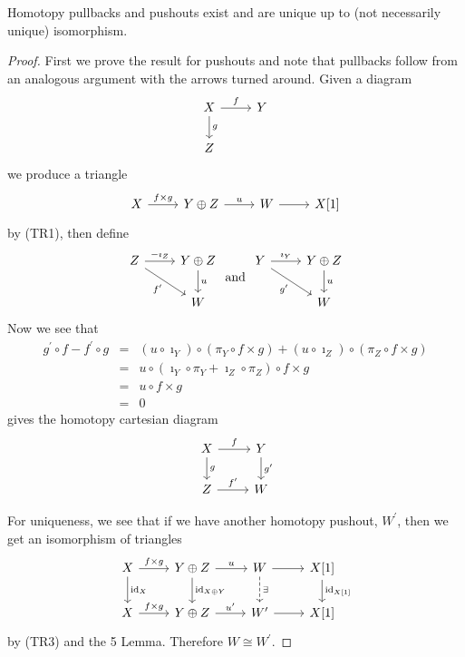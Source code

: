 \documentclass[dissertation.tex]{subfiles}
\begin{document}
\begin{prop}
  Homotopy pullbacks and pushouts exist and are unique up to (not necessarily unique) isomorphism.
  
  \begin{proof}
    First we prove the result for pushouts and note that pullbacks follow from an analogous argument with the arrows turned around.
    Given a diagram
    $$\begin{tikzcd}
      X \arrow{r}{f}\arrow{d}{g} & Y\\
      Z
    \end{tikzcd}$$
    we produce a triangle 
    $$\begin{tikzcd}
      X \arrow{r}{f \times g} & Y \oplus Z \arrow{r}{u} & W \arrow{r} & X[1]
    \end{tikzcd}$$
    by (TR1), then define
    $$\begin{tikzcd}
      Z \arrow{r}{-\imath_Z}\arrow[swap]{rd}{f^\prime} & Y \oplus Z\arrow{d}{u}\\
      & W
    \end{tikzcd}
    \ \text{and}\ 
    \begin{tikzcd}
      Y \arrow{r}{\imath_Y}\arrow[swap]{rd}{g^\prime} & Y \oplus Z\arrow{d}{u}\\
      & W
    \end{tikzcd}$$
    Now we see that
    \begin{eqnarray*}
      g^\prime \circ f - f^\prime \circ g &=& (u \circ \imath_Y) \circ (\pi_Y \circ f \times g) + (u \circ \imath_Z) \circ (\pi_Z \circ f \times g)\\
      &=& u \circ (\imath_Y \circ \pi_Y + \imath_Z \circ \pi_Z) \circ f \times g\\
      &=& u \circ f \times g\\
      &=& 0
    \end{eqnarray*}
    gives the homotopy cartesian diagram
    $$\begin{tikzcd}
      X \arrow{r}{f}\arrow{d}{g} & Y\arrow{d}{g^\prime}\\
      Z \arrow{r}{f^\prime} & W
    \end{tikzcd}$$
    
    For uniqueness, we see that if we have another homotopy pushout, $W^\prime$, then we get an isomorphism of triangles
    $$\begin{tikzcd}
      X \arrow{r}{f \times g}\arrow{d}{\id_X} & Y \oplus Z \arrow{r}{u}\arrow{d}{\id_{X \oplus Y}} & W \arrow{r}\arrow[dashed]{d}{\exists} & X[1]\arrow{d}{\id_{X[1]}}\\
      X \arrow{r}{f \times g} & Y \oplus Z \arrow{r}{u^\prime} & W^\prime \arrow{r} & X[1]
    \end{tikzcd}$$
    by (TR3) and the 5 Lemma.
    Therefore $W \cong W^\prime$.
  \end{proof}
\end{prop}
\end{document}
